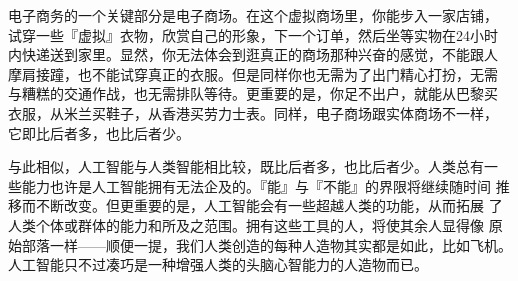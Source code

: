 \documentclass[12pt,a4paper]{article}
\begin{document}
电子商务的一个关键部分是电子商场。在这个虚拟商场里，你能步入一家店铺，
试穿一些『虚拟』衣物，欣赏自己的形象，下一个订单，然后坐等实物在24小时
内快递送到家里。显然，你无法体会到逛真正的商场那种兴奋的感觉，不能跟人
摩肩接蹱，也不能试穿真正的衣服。但是同样你也无需为了出门精心打扮，无需
与糟糕的交通作战，也无需排队等待。更重要的是，你足不出户，就能从巴黎买
衣服，从米兰买鞋子，从香港买劳力士表。同样，电子商场跟实体商场不一样，
它即比后者多，也比后者少。

与此相似，人工智能与人类智能相比较，既比后者多，也比后者少。人类总有一
些能力也许是人工智能拥有无法企及的。『能』与『不能』的界限将继续随时间
推移而不断改变。但更重要的是，人工智能会有一些超越人类的功能，从而拓展
了人类个体或群体的能力和所及之范围。拥有这些工具的人，将使其余人显得像
原始部落一样——顺便一提，我们人类创造的每种人造物其实都是如此，比如飞机。
人工智能只不过凑巧是一种增强人类的头脑心智能力的人造物而已。
\end{document}
